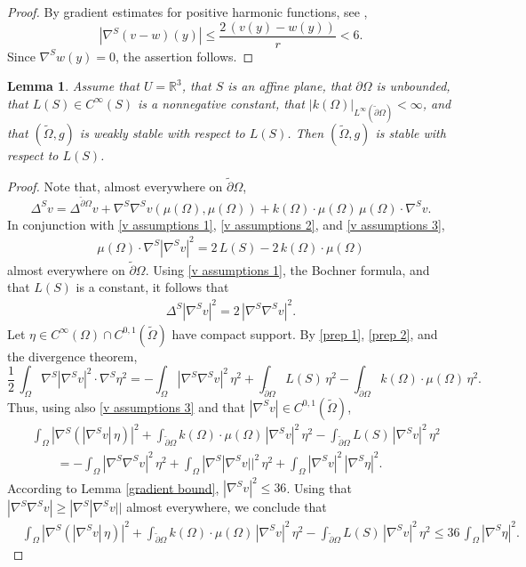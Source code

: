 \documentclass[11pt]{amsart}
\newtheorem{lem}[prop]{Lemma}
\begin{document}
\begin{proof}
By gradient estimates for positive harmonic functions, see \cite[Theorem 2.5 and Theorem 2.10]{GilbargTrudinger},  $$|\nabla^S (v-w)(y)|\leq \frac{2\,(v(y)-w(y))}{r}< 6.$$  
Since $\nabla^Sw(y)=0$, the assertion follows.
\end{proof}

\begin{lem} \label{weak stability stability}
Assume that $U=\mathbb{R}^3$,  that $S$ is an affine plane, that $\partial \Omega$ is unbounded,  that $L(S)\in C^\infty(S)$ is a nonnegative constant,  that   $|k(\Omega)|_{L^\infty(\tilde \partial \Omega)}<\infty$, and that  $(\tilde\Omega,g)$ is weakly stable with respect to $L(S)$. Then $(\tilde \Omega,g)$ is stable with respect to $L(S)$.
\end{lem}
\begin{proof}
	

	Note that, almost everywhere on $\tilde \partial \Omega$,
	$$
	\Delta^S v=\Delta^{\tilde \partial \Omega}v+\nabla^S\nabla^S v(\mu( \Omega),\mu(\Omega))+k(\Omega)\cdot \mu(\Omega)\,\mu(\Omega)\cdot \nabla^S v.
	$$
	In conjunction with \eqref{v assumptions 1}, \eqref{v assumptions 2}, and \eqref{v assumptions 3},   
	\begin{align} \label{prep 1} 
\mu( \Omega)\cdot \nabla^S|\nabla^S v|^2=2\,L(S)-2\,k(\Omega)\cdot \mu(\Omega)
	\end{align} 
almost everywhere on $\tilde \partial \Omega$.	Using \eqref{v assumptions 1}, the  Bochner formula, and that $L(S)$ is a constant, it follows that
	\begin{align} \label{prep 2} 
	\Delta^S|\nabla^Sv|^2=2\,|\nabla^S\nabla^S v|^2.
	\end{align} 
	Let $\eta \in C^\infty(\Omega)\cap C^{0,1}(\tilde \Omega)$ have compact support. By  \eqref{prep 1}, \eqref{prep 2}, and the divergence theorem,
	$$
	\frac12\,\int_\Omega \nabla^S |\nabla^S v|^2\cdot \nabla^S \eta^2=-\int_{\Omega} |\nabla^S\nabla^Sv|^2\,\eta^2+\int_{\tilde \partial \Omega} L(S)\,\eta^2-\int_{\tilde \partial \Omega} k(\Omega)\cdot \mu(\Omega)\,\eta^2.
	$$ 
	Thus,  using also \eqref{v assumptions 3} and that $|\nabla ^Sv|\in C^{0,1}(\tilde \Omega)$,
	\begin{align*} 
	&\int_\Omega |\nabla^S (|\nabla^S v|\,\eta)|^2+\int_{\tilde \partial \Omega} k(\Omega)\cdot \mu(\Omega)\,|\nabla^S v|^2\,\eta^2-\int_{\tilde \partial \Omega}L(S)\,|\nabla^S v|^2\,\eta^2
	\\&\qquad =-\int_{\Omega} |\nabla^S\nabla^Sv|^2\,\eta^2+\int_{\Omega}|\nabla^S|\nabla^Sv||^2\,\eta^2+\int_{ \Omega} |\nabla^S v|^2\,|\nabla^S \eta|^2.
	\end{align*} 
	According to Lemma \ref{gradient bound}, $|\nabla ^Sv|^2\leq 36$. Using that $|\nabla ^S\nabla^S v|\geq |\nabla^S |\nabla^Sv||$ almost everywhere, we conclude that
	\begin{align} \label{error bound} 
		&\int_\Omega |\nabla^S (|\nabla^S v|\,\eta)|^2+\int_{\tilde \partial \Omega} k(\Omega)\cdot \mu(\Omega)\,|\nabla^S v|^2\,\eta^2-\int_{\tilde \partial \Omega}L(S)\,|\nabla^S v|^2\,\eta^2
			 \leq 36\,\int_{\Omega} |\nabla^S \eta|^2.
	\end{align} 
	

\end{proof}
\end{document}

